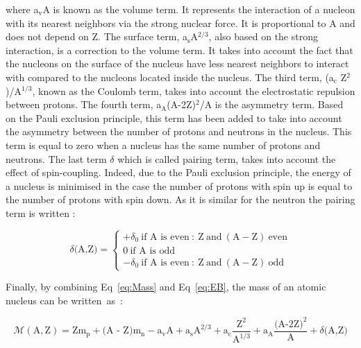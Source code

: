 \documentclass[main.tex]{subfiles}
\begin{document}
\bigskip


\NI where a$_\text{v}$A is known as the volume term. It represents the interaction of a nucleon with its nearest neighbors via the strong nuclear force. It is proportional to A and does not depend on Z. The surface term, a$_\text{s}$A$^{\text{2/3}}$, also based on the strong interaction, is a correction to the volume term. It takes into account the fact that the nucleons on the surface of the nucleus have less nearest neighbors to interact with compared to the nucleons located inside the nucleus. The third term, (a$_\text{c}$ Z$^\text{2}$)/A$^{\text{1/3}}$, known as the Coulomb term, takes into account the electrostatic repulsion between protons. The fourth term, a$_\text{A}$(A-2Z)$^\text{2}$/A is the asymmetry term. Based on the Pauli exclusion principle, this term has been added to take into account the asymmetry between the number of protons and neutrons in the nucleus. This term is equal to zero when a nucleus has the same number of protons and neutrons. The last term $\delta$ which is called pairing term, takes into account the effect of spin-coupling. Indeed, due to the Pauli exclusion principle, the energy of a nucleus is minimised in the case the number of protons with spin up is equal to the number of protons with spin down. As it is similar for the neutron the pairing term is written : 


\begin{equation}
\delta \text{(A,Z)} = 
\left\{
\begin{array}{l}
  +\delta_0~\text{if~A is even}~:~\text{Z}~\text{and}~(\text{A}-\text{Z})~\text{even} \\[0.3cm]
  \text{0}~\text{if~A~is odd}\\[0.3cm]
  -\delta_0~\text{if~A is even}~:~\text{Z}~\text{and}~(\text{A}-\text{Z})~\text{odd}
\end{array}
\right.
\end{equation}


\bigskip


\NI Finally, by combining Eq~\ref{eq:Mass} and Eq~\ref{eq:EB}, the mass of an atomic nucleus can be written~as~:


\begin{equation}\label{eq:MassFinal}
\mathcal{M} (\text{A},\text{Z}) = \text{Z}\text{m}_\text{p} + \text{(A - Z)}\text{m}_{\text{n}} - \text{a}_\text{v} \text{A} + \text{a}_\text{s} \text{A}^{\text{2/3}} +  \text{a}_\text{c} \frac{\text{Z}^\text{2}}{\text{A}^{\text{1/3}}} +  \text{a}_\text{A} \frac{\text{(A-2Z)}^\text{2}}{\text{A}} + \delta \text{(A,Z)} 
\end{equation}
\end{document}
